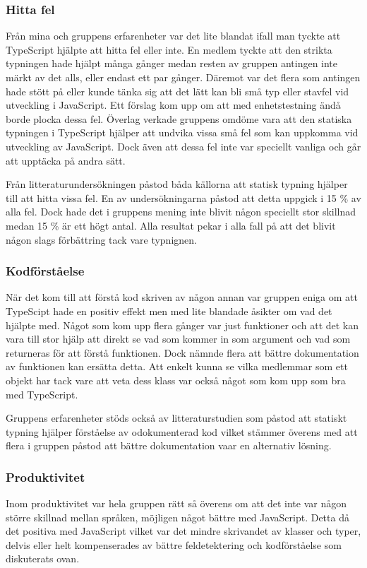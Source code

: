 \subsubsection{Hitta fel}
Från mina och gruppens erfarenheter var det lite blandat ifall man tyckte att TypeScript hjälpte att hitta fel eller inte. En medlem tyckte att den strikta typningen hade hjälpt många gånger medan resten av gruppen antingen inte märkt av det alls, eller endast ett par gånger. Däremot var det flera som antingen hade stött på eller kunde tänka sig att det lätt kan bli små typ eller stavfel vid utveckling i JavaScript. Ett förslag kom upp om att med enhetstestning ändå borde plocka dessa fel. Överlag verkade gruppens omdöme vara att den statiska typningen i TypeScript hjälper att undvika vissa små fel som kan uppkomma vid utveckling av JavaScript. Dock även att dessa fel inte var speciellt vanliga och går att upptäcka på andra sätt.

Från litteraturundersökningen påstod båda källorna att statisk typning hjälper till att hitta vissa fel. En av undersökningarna påstod att detta uppgick i 15 \% av alla fel. \cite{henrik_totypeornot} Dock hade det i gruppens mening inte blivit någon speciellt stor skillnad medan 15 \% är ett högt antal. Alla resultat pekar i alla fall på att det blivit någon slags förbättring tack vare typnignen.
\subsubsection{Kodförståelse}
När det kom till att förstå kod skriven av någon annan var gruppen eniga om att TypeScipt hade en positiv effekt men med lite blandade åsikter om vad det hjälpte med. Något som kom upp flera gånger var just funktioner och att det kan vara till stor hjälp att direkt se vad som kommer in som argument och vad som returneras för att förstå funktionen. Dock nämnde flera att bättre dokumentation av funktionen kan ersätta detta. Att enkelt kunna se vilka medlemmar som ett objekt har tack vare att veta dess klass var också något som kom upp som bra med TypeScript.

Gruppens erfarenheter stöds också av litteraturstudien som påstod att statiskt typning hjälper förståelse av odokumenterad kod \cite{henrik_maintainability} vilket stämmer överens med att flera i gruppen påstod att bättre dokumentation vaar en alternativ lösning.
\subsubsection{Produktivitet}
Inom produktivitet var hela gruppen rätt så överens om att det inte var någon större skillnad mellan språken, möjligen något bättre med JavaScript. Detta då det positiva med JavaScript vilket var det mindre skrivandet av klasser och typer, delvis eller helt kompenserades av bättre feldetektering och kodförståelse som diskuterats ovan.

